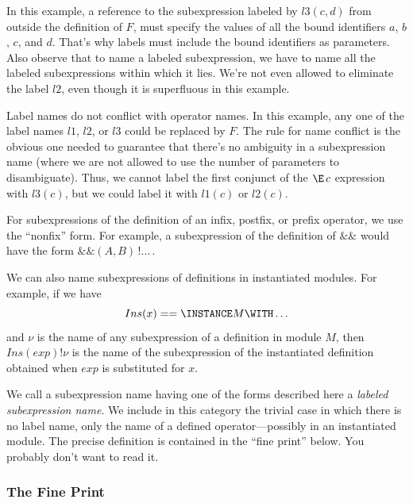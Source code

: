 \documentclass[fleqn,leqno]{article}
\begin{document}
In this example, a reference to the subexpression labeled by $l3(c,d)$
from outside the definition of $F$, must specify the values of all the
bound identifiers $a$, $b$, $c$, and $d$.  That's why labels must
include the bound identifiers as parameters.  Also observe that to
name a labeled subexpression, we have to name all the labeled
subexpressions within which it lies.  We're not even allowed to
eliminate the label $l2$, even though it is superfluous in this
example.

Label names do not conflict with operator names.  In this example, any
one of the label names $l1$, $l2$, or $l3$ could be replaced by $F$.
The rule for name conflict is the obvious one needed to guarantee that
there's no ambiguity in a subexpression name (where we are not allowed
to use the number of parameters to disambiguate).  Thus, we cannot
label the first conjunct of the $\E\,c$ expression with $l3(c)$, but
we could label it with $l1(c)$ or $l2(c)$.

For subexpressions of the definition of an infix, postfix, or prefix
operator, we use the ``nonfix'' form.  For example, a subexpression of
the definition of $\&\&$ would have the form $\&\&(A, B)\,!\ldots$\,.

We can also name subexpressions of definitions in instantiated modules.
For example, if we have
 \[ Ins(x) == \INSTANCE M \WITH \ldots
 \]
and $\nu$ is the name of any subexpression of a definition in module
$M$, then $Ins(exp)!\nu$ is the name of the subexpression of the
instantiated definition obtained when $exp$ is substituted for $x$.

We call a subexpression name having one of the forms described here a
\emph{labeled subexpression name}.  We include in this category the
trivial case in which there is no label name, only the name of a
defined operator---possibly in an instantiated module.  The precise
definition is contained in the ``fine print'' below.  You probably
don't want to read it.


\subsubsection*{The Fine Print}
\end{document}
